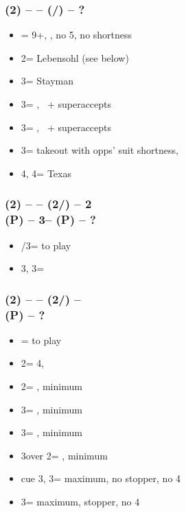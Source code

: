 \subsubsection*{(2\diams) -- \dbl -- (\hearts/\spades) -- ?}        
\begin{itemize}
    \item \dbl = 9+, \fton{2\nt}, no 5\major, no \major shortness
    \item 2\nt = Lebensohl (see below)
    \item 3\clubs = Stayman \vimp
    \item 3\diams = \trsf{\hearts}, \gf\ + superaccepts
    \item 3\hearts = \trsf{\spades}, \gf\ + superaccepts
    \item 3\spades = takeout with opps' suit shortness, \gf
    \item 4\diams, 4\hearts = Texas
\end{itemize}

\subsubsection*{(2\diams) -- \dbl -- (2\hearts/\spades) -- 2\nt \\
                (P) -- 3\clubs -- (P) -- ?}        
\begin{itemize}
    \item \pass/3\diams = to play
    \item 3\hearts, 3\spades = \inv
\end{itemize}

\subsubsection*{(2\diams) -- \dbl -- (2\hearts/\spades) -- \dbl \\
                (P) -- ?}        
\begin{itemize}
    \item \pass = to play
    \item 2\spades = 4\spades, \fonce
    \item 2\nt = \nat, minimum
    \item 3\clubs = \nat, minimum
    \item 3\diams = \nat, minimum
    \item 3\hearts over 2\spades = \nat, minimum
    \item cue 3\hearts, 3\spades = maximum, no stopper, no 4\spades
    \item 3\nt = maximum, stopper, no 4\spades
\end{itemize}

